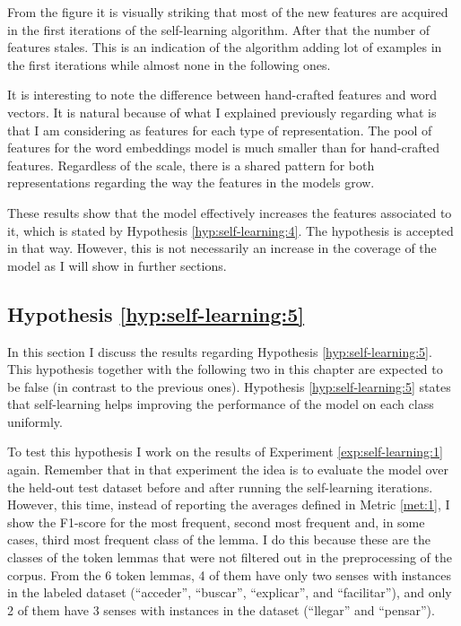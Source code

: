 From the figure it is visually striking that most of the new features are
acquired in the first iterations of the self-learning algorithm. After that the
number of features stales. This is an indication of the algorithm adding lot of
examples in the first iterations while almost none in the following ones.

It is interesting to note the difference between hand-crafted features and word
vectors. It is natural because of what I explained previously regarding what is
that I am considering as features for each type of representation. The pool of
features for the word embeddings model is much smaller than for hand-crafted
features. Regardless of the scale, there is a shared pattern for both
representations regarding the way the features in the models grow.

These results show that the model effectively increases the features associated
to it, which is stated by Hypothesis \ref{hyp:self-learning:4}. The hypothesis
is accepted in that way. However, this is not necessarily an increase in the
coverage of the model as I will show in further sections.

\subsection{Hypothesis \ref{hyp:self-learning:5}}\label{sec:self-learning:hyp:5}

In this section I discuss the results regarding Hypothesis
\ref{hyp:self-learning:5}. This hypothesis together with the following two in
this chapter are expected to be false (in contrast to the previous ones).
Hypothesis \ref{hyp:self-learning:5} states that self-learning helps improving
the performance of the model on each class uniformly.

To test this hypothesis I work on the results of Experiment
\ref{exp:self-learning:1} again. Remember that in that experiment the idea is
to evaluate the model over the held-out test dataset before and after running
the self-learning iterations. However, this time, instead of reporting the
averages defined in Metric \ref{met:1}, I show the F1-score for the most
frequent, second most frequent and, in some cases, third most frequent class of
the lemma. I do this because these are the classes of the token lemmas that
were not filtered out in the preprocessing of the corpus. From the 6 token
lemmas, 4 of them have only two senses with instances in the labeled dataset
(``acceder'', ``buscar'', ``explicar'', and ``facilitar''), and only 2 of them
have 3 senses with instances in the dataset (``llegar'' and ``pensar'').


